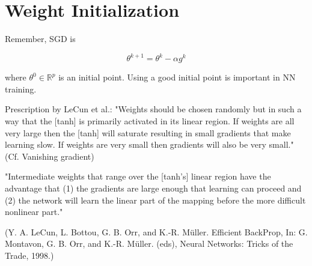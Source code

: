 \documentclass{report}
\begin{document}
\section{Weight Initialization}

\begin{concept}
    Remember, SGD is

    $$
    \theta^{k+1}=\theta^{k}-\alpha g^{k}
    $$

    where $\theta^{0} \in \mathbb{R}^{p}$ is an initial point. Using a good initial point is important in NN training.

    Prescription by LeCun et al.: "Weights should be chosen randomly but in such a way that the [tanh] is primarily activated in its linear region. If weights are all very large then the [tanh] will saturate resulting in small gradients that make learning slow. If weights are very small then gradients will also be very small." (Cf. Vanishing gradient)

    "Intermediate weights that range over the [tanh's] linear region have the advantage that (1) the gradients are large enough that learning can proceed and (2) the network will learn the linear part of the mapping before the more difficult nonlinear part."

    (Y. A. LeCun, L. Bottou, G. B. Orr, and K.-R. Müller. Efficient BackProp, In: G. Montavon, G. B. Orr, and K.-R. Müller. (eds), Neural Networks: Tricks of the Trade, 1998.)
\end{concept}
\end{document}
